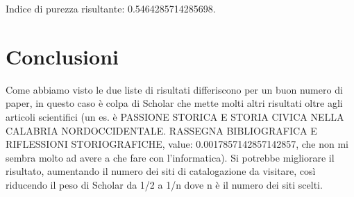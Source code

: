 \documentclass[12pt]{article}
\begin{document}
Indice di purezza risultante: 0.5464285714285698.

\section{Conclusioni}
Come abbiamo visto le due liste di risultati differiscono per un buon numero di paper, in questo caso \`e colpa di Scholar che mette molti altri risultati oltre agli articoli scientifici (un es. \`e PASSIONE STORICA E STORIA CIVICA NELLA CALABRIA NORDOCCIDENTALE. RASSEGNA BIBLIOGRAFICA E RIFLESSIONI STORIOGRAFICHE, value: 0.0017857142857142857, che non mi sembra molto ad avere a che fare con l'informatica). Si potrebbe migliorare il risultato, aumentando il numero dei siti di catalogazione da visitare, cos\`i riducendo il peso di Scholar da 1/2 a 1/n dove n \`e il numero dei siti scelti.
\end{document}
